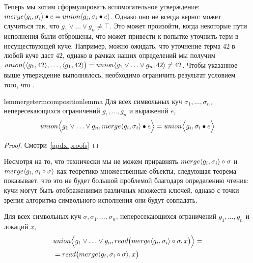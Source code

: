 %
Теперь мы хотим сформулировать вспомогательное утверждение: $merge\langle g_i, \sigma_i\rangle\bullet e=union\langle g_i, \sigma_i\bullet e\rangle$. Однако оно не всегда верно: может случиться так, что $g_1\vee\ldots\vee g_n \neq \top$. Это может произойти, когда некоторые пути исполнения были отброшены, что может привести к попытке уточнить терм в несуществующей куче. Например, можно ожидать, что уточнение терма $42$ в любой куче даст $42$, однако в рамках наших определений мы получим $union\big(\langle g_1, 42\rangle,\ldots,\langle g_1, 42\rangle\big)=union\langle g_1\vee\ldots\vee g_n, 42\rangle\neq 42$. Чтобы указанное выше утверждение выполнялось, необходимо ограничить результат условием того, что .
%
\begin{restatable}{lem}{mergetermcompositionlemma}\label{thm:merge-term-composition}
Для всех символьных куч $\sigma_1,\ldots,\sigma_n$, непересекающихся ограничений $g_1,\ldots,g_n$ и выражений $e$,
\begin{align*}
union\Big\langle g_1\vee\ldots\vee g_n, merge\langle g_i, \sigma_i\rangle\bullet e\Big\rangle=union\Big\langle g_i, \sigma_i\bullet e\Big\rangle
\end{align*}
\end{restatable}
\begin{proof}
Смотри~\autoref{apdx:proofs}
\end{proof}
%
Несмотря на то, что технически мы не можем приравнять $merge{\langle g_i, \sigma_i\rangle}\circ\sigma$ и $merge{\langle g_i, \sigma_i\circ\sigma\rangle}$ как теоретико-множественные объекты, следующая теорема показывает, что это не будет большой проблемой благодаря определению чтения:  кучи могут быть отображениями различных множеств ключей, однако с точки зрения алгоритма символьного исполнения они будут совпадать.
%
\begin{thm}\label{thm:merge-left-compose}
Для всех символьных куч $\sigma,\sigma_1,\ldots,\sigma_n$, непересекающихся ограничений $g_1,\ldots,g_n$ и локаций $x$,
\begin{align*}
&union\Big\langle g_1\vee\ldots\vee g_n, read\big(merge{\langle g_i, \sigma_i\rangle}\circ\sigma,x\big)\Big\rangle=\\
&=read\big(merge{\langle g_i, \sigma_i\circ\sigma\rangle},x\big)
\end{align*}
\end{thm}
